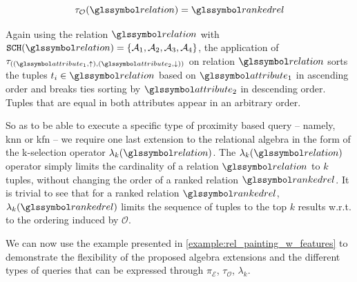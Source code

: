 \begin{equation}
    \label{equation:rel_alg_tau}
    \tau_{\mathcal{O}}(\relation) = \rankedrel
\end{equation}

Again using the relation $\relation$ with $\mathtt{SCH}(\relation) = \{ \mathcal{A}_1, \mathcal{A}_2, \mathcal{A}_3, \mathcal{A}_4 \}$, the application of $\tau_{((\attribute_1,\uparrow),(\attribute_2,\downarrow))}$ on relation $\relation$ sorts the tuples $t_i \in \relation$ based on $\attribute_1$ in ascending order and breaks ties sorting by $\attribute_2$ in descending order. Tuples that are equal in both attributes appear in an arbitrary order.

So as to be able to execute a specific type of proximity based query -- namely, \acrshort{knn} or \acrshort{kfn} -- we require one last extension to the relational algebra in the form of the k-selection operator $\lambda_k(\relation)$. The $\lambda_k(\relation)$ operator simply limits the cardinality of a relation $\relation$ to $k$ tuples, without changing the order of a ranked relation $\rankedrel$. It is trivial to see that for a ranked relation $\rankedrel$, $\lambda_k(\rankedrel)$ limits the sequence of tuples to the top $k$ results w.r.t. to the ordering induced by $\mathcal{O}$.

We can now use the example presented in \cref{example:rel_painting_w_features} to demonstrate the flexibility of the proposed algebra extensions and the different types of queries that can be expressed through $\pi_{\mathcal{E}}$, $\tau_{\mathcal{O}}$, $\lambda_k$.

